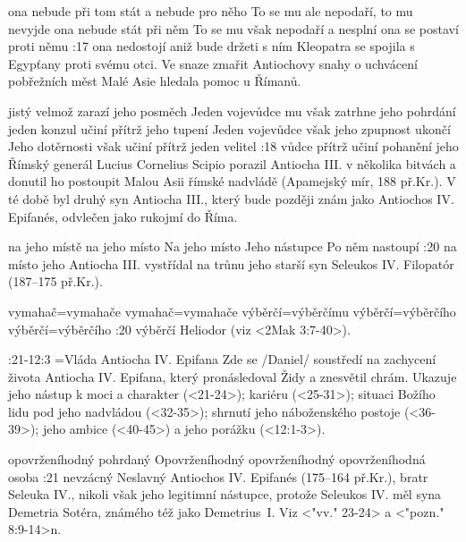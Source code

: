     {ona nebude při tom stát a nebude pro něho}   %
    {To se mu ale nepodaří, to mu nevyjde}   %
    {ona nebude stát při něm}   %
    {To se mu však nepodaří a nesplní}   %
    {ona se postaví proti němu}   %
:17 {ona nedostojí aniž bude držeti s ním}
   Kleopatra se spojila s Egypťany proti svému otci. Ve snaze zmařit Antiochovy snahy o uchvácení pobřežních měst Malé Asie hledala pomoc u Římanů.  

    {jistý velmož zarazí jeho posměch}   %
    {Jeden vojevůdce mu však zatrhne jeho pohrdání}   %
    {jeden konzul učiní přítrž jeho tupení}   %
    {Jeden vojevůdce však jeho zpupnost ukončí}   %
    {Jeho dotěrnosti však učiní přítrž jeden velitel}   %
:18 {vůdce přítrž učiní pohanění jeho}  
    Římský generál Lucius Cornelius Scipio porazil Antiocha III. v několika bitvách a donutil ho postoupit Malou Asii římské nadvládě (Apamejský mír, 188 př.Kr.). V té době byl druhý syn Antiocha III., který bude později  znám jako Antiochos IV. Epifanés, odvlečen jako rukojmí do Říma.

    {na jeho místě}   %
    {na jeho místo}   %
    {Na jeho místo}   %
    {Jeho nástupce}   %
    {Po něm nastoupí}   %
:20 {na místo jeho}
    Antiocha III. vystřídal na trůnu jeho starší syn Seleukos IV. Filopatór (187--175 př.Kr.).

    {vymahač}={vymahače}   %
    {vymahač}={vymahače}   %
    {výběrčí}={výběrčímu}   %
    {výběrčí}={výběrčího}   %
    {výběrčí}={výběrčího}   %
:20 {výběrčí}
    Heliodor (viz <2Mak 3:7-40>).
    
:21-12:3 {}={Vláda Antiocha IV. Epifana}
        Zde se \x/Daniel/ soustředí na zachycení života Antiocha IV. Epifana, který pronásledoval Židy a znesvětil chrám. Ukazuje jeho nástup k moci a charakter (<21-24>);  kariéru
        (<25-31>); situaci Božího lidu pod jeho nadvládou (<32-35>); shrnutí jeho náboženského postoje  (<36-39>); jeho ambice  (<40-45>) a jeho porážku (<12:1-3>).

    {opovrženíhodný}  %
    {pohrdaný}   %
    {Opovrženíhodný}   %
    {opovrženíhodný}   %
    {opovrženíhodná osoba}   %
:21 {nevzácný} 
        Neslavný Antiochos IV. Epifanés (175--164 př.Kr.), bratr Seleuka IV., nikoli však jeho legitimní nástupce, protože Seleukos IV. měl syna Demetria Sotéra, známého též jako Demetrius~I. Viz <"vv." 23-24> a <"pozn." 8:9-14>n.

